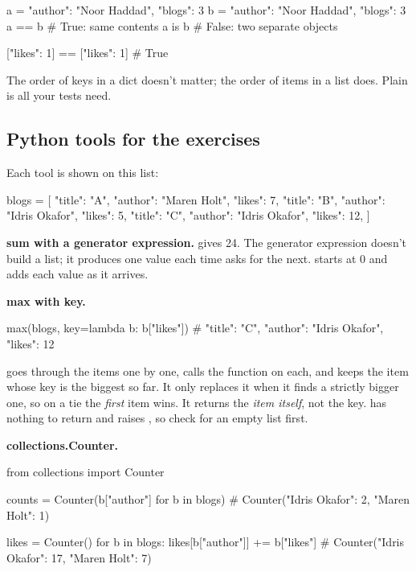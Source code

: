 \begin{py}
a = {"author": "Noor Haddad", "blogs": 3}
b = {"author": "Noor Haddad", "blogs": 3}
a == b    # True: same contents
a is b    # False: two separate objects

[{"likes": 1}] == [{"likes": 1}]   # True
\end{py}

The order of keys in a dict doesn't matter; the order of items in a list does. Plain  is all your tests need.

\subsection{Python tools for the exercises}

Each tool is shown on this list:

\begin{py}
blogs = [
	{"title": "A", "author": "Maren Holt", "likes": 7},
	{"title": "B", "author": "Idris Okafor", "likes": 5},
	{"title": "C", "author": "Idris Okafor", "likes": 12},
]
\end{py}

\textbf{sum with a generator expression.}  gives 24. The generator expression doesn't build a list; it produces one value each time  asks for the next.  starts at 0 and adds each value as it arrives.

\textbf{max with key.}

\begin{py}
max(blogs, key=lambda b: b["likes"])   # {"title": "C", "author": "Idris Okafor", "likes": 12}
\end{py}

 goes through the items one by one, calls the  function on each, and keeps the item whose key is the biggest so far. It only replaces it when it finds a strictly bigger one, so on a tie the \emph{first} item wins. It returns the \emph{item itself}, not the key.  has nothing to return and raises , so check for an empty list first.

\textbf{collections.Counter.}

\begin{py}
from collections import Counter

counts = Counter(b["author"] for b in blogs)   # Counter({"Idris Okafor": 2, "Maren Holt": 1})

likes = Counter()
for b in blogs:
	likes[b["author"]] += b["likes"]           # Counter({"Idris Okafor": 17, "Maren Holt": 7})
\end{py}

